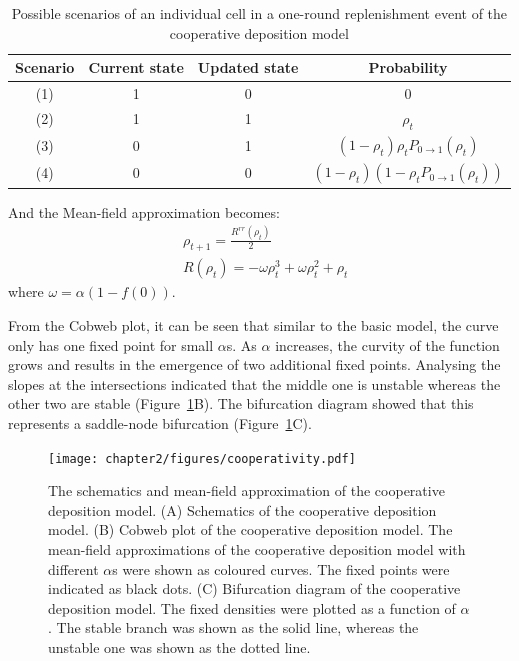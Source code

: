 \begin{table}[htbp]
\centering
\caption{Possible scenarios of an individual cell in a one-round replenishment event of the cooperative deposition model}
\label{tab:MFAscenariosCoop}
\begin{tabular}{cccc}
\hline
\textbf{Scenario} & \textbf{Current state} & \textbf{Updated state} & \textbf{Probability} \\ \hline
(1) & 1                        & 0                      & 0                    \\
(2) & 1                        & 1                      & $\rho_{t}$                    \\
(3) & 0                        & 1                      & $(1 - \rho_{t})\rho_{t}P_{0\rightarrow 1}(\rho_{t})$     \\
(4) & 0                        & 0                      & $(1 - \rho_{t})(1 - \rho_{t}P_{0\rightarrow 1}(\rho_{t}))$ \\ \hline
\end{tabular}
\end{table}

And the Mean-field approximation becomes:
\begin{equation}\label{eq:7}
\begin{split}
            &\rho_{t+1} = \frac{R^{rr}(\rho_{t})}{2} \\
            &R(\rho_{t}) = -\omega \rho_{t}^{3} + \omega \rho_{t}^{2} + \rho_{t}
\end{split}
\end{equation}
where $\omega = \alpha(1 - f(0))$. 

From the Cobweb plot, it can be seen that similar to the basic model, the curve only has one fixed point for small $\alpha$s. As $\alpha$ increases, the curvity of the function grows and results in the emergence of two additional fixed points. Analysing the slopes at the intersections indicated that the middle one is unstable whereas the other two are stable (Figure~\ref{fig:coopSchematics}B). The bifurcation diagram showed that this represents a saddle-node bifurcation (Figure~\ref{fig:coopSchematics}C). 

\begin{figure}[htbp]
  \centering
  \texttt{[image: chapter2/figures/cooperativity.pdf]}
  \caption[The schematics and mean-field approximation of the cooperative deposition model]{The schematics and mean-field approximation of the cooperative deposition model. (A) Schematics of the cooperative deposition model. (B) Cobweb plot of the cooperative deposition model. The mean-field approximations of the cooperative deposition model with different $\alpha$s were shown as coloured curves. The fixed points were indicated as black dots. (C) Bifurcation diagram of the cooperative deposition model. The fixed densities were plotted as a function of $\alpha$. The stable branch was shown as the solid line, whereas the unstable one was shown as the dotted line.}
  \label{fig:coopSchematics}
\end{figure}

